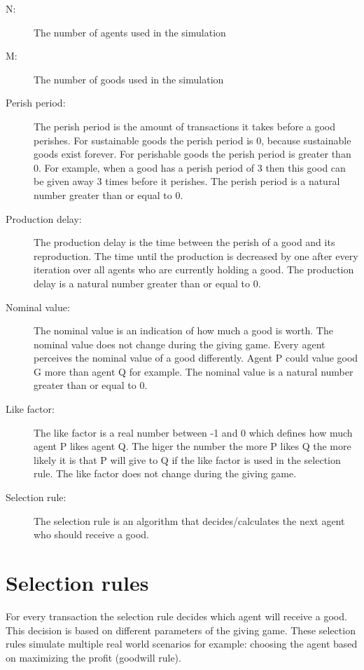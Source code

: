 \documentclass[twoside,openright]{uva-bachelor-thesis}
\begin{document}
\begin{description}
  \item[N:] The number of agents used in the simulation
  \item[M:] The number of goods used in the simulation
  \item[Perish period:] The perish period is the amount of transactions it takes before a good perishes. For sustainable goods the perish period is 0, because sustainable goods exist forever. For perishable goods the perish period is greater than 0. For example, when a good has a perish period of 3 then this good can be given away 3 times before it perishes. The perish period is a natural number greater than or equal to 0.
  \item[Production delay:] The production delay is the time between the perish of a good and its reproduction. The time until the production is decreased by one after every iteration over all agents who are currently holding a good. The production delay is a natural number greater than or equal to 0.
  \item[Nominal value:] The nominal value is an indication of how much a good is worth. The nominal value does not change during the giving game. Every agent perceives the nominal value of a good differently. Agent P could value good G more than agent Q for example. The nominal value is a natural number greater than or equal to 0.
  \item[Like factor:] The like factor is a real number between -1 and 0 which defines how much agent P likes agent Q. The higer the number the more P likes Q the more likely it is that P will give to Q if the like factor is used in the selection rule. The like factor does not change during the giving game. 
  \item[Selection rule:] The selection rule is an algorithm that decides/calculates the next agent who should receive a good.

\end{description}

\section{Selection rules}
For every transaction the selection rule decides which agent will receive a good. This decision is based on different parameters of the giving game. These selection rules simulate  multiple real world scenarios for example: choosing the agent based on maximizing the profit (goodwill rule).
\end{document}
